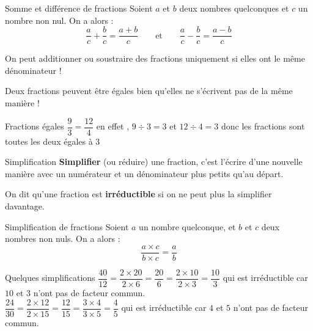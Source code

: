\documentclass[oneside,12pt]{article}          %
\begin{document}
\begin{propriete}{Somme et différence de fractions}
	Soient $a$ et $b$ deux nombres quelconques et $c$ un nombre non nul. On a alors :
	\[ \dfrac{a}{c} + \dfrac{b}{c} = \dfrac{a+b}{c} \qquad \text{et} \qquad \dfrac{a}{c} - \dfrac{b}{c} = \dfrac{a-b}{c} \]
\end{propriete}

\begin{remarque}
	On peut additionner ou soustraire des fractions uniquement si elles ont le même dénominateur !
\end{remarque}



\begin{remarque}
	Deux fractions peuvent être égales bien qu'elles ne s'écrivent pas de la même manière !
\end{remarque}

\begin{exemple}{Fractions égales}
	$\dfrac{9}{3}=\dfrac{12}{4}$ \quad en effet , $9 \div 3 = 3$ et $12 \div 4 = 3$ donc les fractions sont toutes les deux égales à $3$
\end{exemple}



\begin{definition}{Simplification}
	\textbf{Simplifier} (ou réduire) une fraction, c'est l'écrire d'une nouvelle manière avec un numérateur et un dénominateur plus petits qu'au départ.
	
	On dit qu'une fraction est \textbf{irréductible} si on ne peut plus la simplifier davantage.
\end{definition}



\begin{propriete}{Simplification de fractions} 
	Soient $a$ un nombre quelconque, et $b$ et $c$ deux nombres non nuls. On a alors :
	\[ \dfrac{a \times c}{b \times c} = \dfrac{a}{b} \]
\end{propriete}

\begin{exemple}{Quelques simplifications}
	$\dfrac{40}{12} = \dfrac{2 \times 20}{2 \times 6} = \dfrac{20}{6} = \dfrac{2 \times 10}{2 \times 3} = \dfrac{10}{3}$ \quad qui est irréductible car $10$ et $3$ n'ont pas de facteur commun. \\[10pt]	
	$\dfrac{24}{30} = \dfrac{2 \times 12}{2 \times 15} = \dfrac{12}{15} = \dfrac{3 \times 4}{3 \times 5} = \dfrac{4}{5}$  \quad qui est irréductible car $4$ et $5$ n'ont pas de facteur commun.
\end{exemple}
\end{document}
